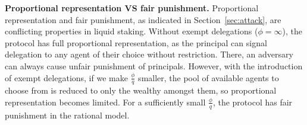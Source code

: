 
\noindent
\textbf{Proportional representation VS fair punishment.}
Proportional representation and fair punishment, as indicated in
Section~\ref{sec:attack}, are conflicting properties in liquid
staking. Without exempt delegations ($\phi = \infty$),
the protocol has full proportional representation, as the principal can
signal delegation to any agent of their choice without restriction. There,
an adversary can always cause unfair punishment of principals.
However, with the introduction of exempt delegations, if we make
$\frac{\phi}{q}$ smaller, the pool of available agents to choose from is reduced to
only the wealthy amongst them, so proportional representation
becomes limited. For a sufficiently small $\frac{\phi}{q}$,
the protocol has fair punishment in the rational model.

%
%

